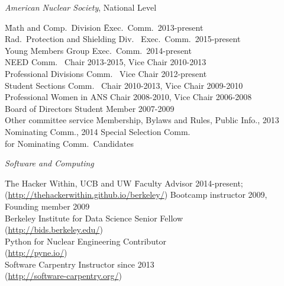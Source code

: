 \textit{American Nuclear Society}, National Level
\begin{tabbing}
\hspace*{2 em}\= Math and Comp.\ Division \hspace*{6em} \= Exec.\ Comm.\ 2013-present \\
%
\> Rad.\ Protection and Shielding Div.\ \> Exec.\ Comm.\ 2015-present\\
%
\> Young Members Group \> Exec.\ Comm.\ 2014-present\\
%
\> NEED Comm.\ \> Chair 2013-2015, Vice Chair 2010-2013\\
%
\> Professional Divisions Comm.\ \> Vice Chair 2012-present \\
%
\> Student Sections Comm.\ \> Chair 2010-2013, Vice Chair 2009-2010\\
%
\> Professional Women in ANS \> Chair 2008-2010, Vice Chair 2006-2008\\	
%
\> Board of Directors \> Student Member 2007-2009\\
%
\> Other committee service \>	Membership, Bylaws and Rules, Public Info., 2013 \\ \> \> Nominating Comm., 2014 Special Selection Comm.\ \\ \> \> for Nominating Comm.\ Candidates
\end{tabbing}

\vspace*{-.5em}
\textit{Software and Computing}
\begin{tabbing}
\hspace*{2 em}\= The Hacker Within, UCB and UW \hspace*{6em} \= Faculty Advisor 2014-present; \\ 
\>\hspace*{1 em}(\href{http://thehackerwithin.github.io/berkeley/}{http://thehackerwithin.github.io/berkeley/}) \>Bootcamp instructor 2009, Founding member 2009\\
%
\> Berkeley Institute for Data Science \> Senior Fellow \\
\> \hspace*{1 em}(\href{http://bids.berkeley.edu/}{http://bids.berkeley.edu/})\\
%
\> Python for Nuclear Engineering  \> Contributor \\
\> \hspace*{1 em}(\href{http://pyne.io/}{http://pyne.io/})\\
%
\> Software Carpentry  \> Instructor since 2013\\
\> \hspace*{1 em}(\href{http://software-carpentry.org/}{http://software-carpentry.org/})
\end{tabbing}

